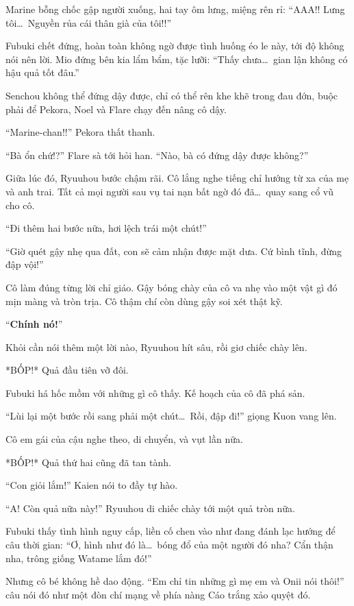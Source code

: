\documentclass[../main.tex]{subfiles}
\begin{document}
Marine bỗng chốc gập người xuống, hai tay ôm lưng, miệng rên rỉ: ``AAA!! Lưng tôi\dots\ Nguyền rủa cái thân già của tôi!!''

Fubuki chết đứng, hoàn toàn không ngờ được tình huống éo le này, tới độ không nói nên lời. Mio đứng bên kia lẩm bẩm, tặc lưỡi: ``Thấy chưa\dots\ gian lận không có hậu quả tốt đâu.''

Senchou không thể đứng dậy được, chỉ có thể rên khe khẽ trong đau đớn, buộc phải để Pekora, Noel và Flare chạy đến nâng cô dậy.

``Marine-chan!!'' Pekora thất thanh.

``Bà ổn chứ!?'' Flare sà tới hỏi han. ``Nào, bà có đứng dậy được không?''

Giữa lúc đó, Ryuuhou bước chậm rãi. Cô lắng nghe tiếng chỉ hướng từ xa của mẹ và anh trai. Tất cả mọi người sau vụ tai nạn bất ngờ đó đã\dots\ quay sang cổ vũ cho cô.

``Đi thêm hai bước nữa, hơi lệch trái một chút!''

``Giờ quét gậy nhẹ qua đất, con sẽ cảm nhận được mặt dưa. Cứ bình tĩnh, đừng đập vội!''

Cô làm đúng từng lời chỉ giáo. Gậy bóng chày của cô va nhẹ vào một vật gì đó mịn màng và tròn trịa. Cô thậm chí còn dùng gậy soi xét thật kỹ.

``{\textbf{Chính nó!}}''

Khỏi cần nói thêm một lời nào, Ryuuhou hít sâu, rồi giơ chiếc chày lên.

*BỐP!* Quả đầu tiên vỡ đôi.

Fubuki há hốc mồm với những gì cô thấy. Kế hoạch của cô đã phá sản.

``Lùi lại một bước rồi sang phải một chút\dots\ Rồi, đập đi!'' giọng Kuon vang lên.

Cô em gái của cậu nghe theo, di chuyển, và vụt lần nữa.

*BỐP!* Quả thứ hai cũng đã tan tành.

``Con giỏi lắm!'' Kaien nói to đầy tự hào.

``A! Còn quả nữa này!'' Ryuuhou di chiếc chày tới một quả tròn nữa.

Fubuki thấy tình hình nguy cấp, liền cố chen vào như đang đánh lạc hướng để câu thời gian: ``Ơ, hình như đó là\dots\ bóng đổ của một người đó nha? Cẩn thận nha, trông giống Watame lắm đó!''

Nhưng cô bé không hề dao động. ``Em chỉ tin những gì mẹ em và Onii nói thôi!'' câu nói đó như một đòn chí mạng về phía nàng Cáo trắng xảo quyệt đó.
\end{document}
